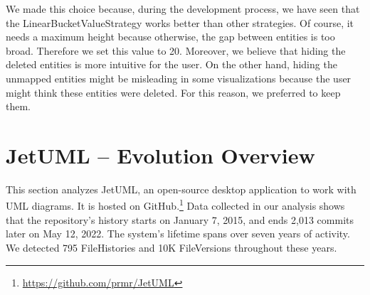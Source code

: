 We made this choice because, during the development process, we have seen that the LinearBucketValueStrategy works better than other strategies. Of course, it needs a maximum height because otherwise, the gap between entities is too broad. Therefore we set this value to 20. Moreover, we believe that hiding the deleted entities is more intuitive for the user. On the other hand, hiding the unmapped entities might be misleading in some visualizations because the user might think these entities were deleted. For this reason, we preferred to keep them. 


\newpage
\section{JetUML – Evolution Overview}
This section analyzes JetUML, an open-source desktop application to work with UML diagrams. It is hosted on GitHub.\footnote{\url{https://github.com/prmr/JetUML}} Data collected in our analysis shows that the repository's history starts on January 7, 2015, and ends 2,013 commits later on May 12, 2022. The system's lifetime spans over seven years of activity. We detected 795 FileHistories and 10K FileVersions throughout these years.

